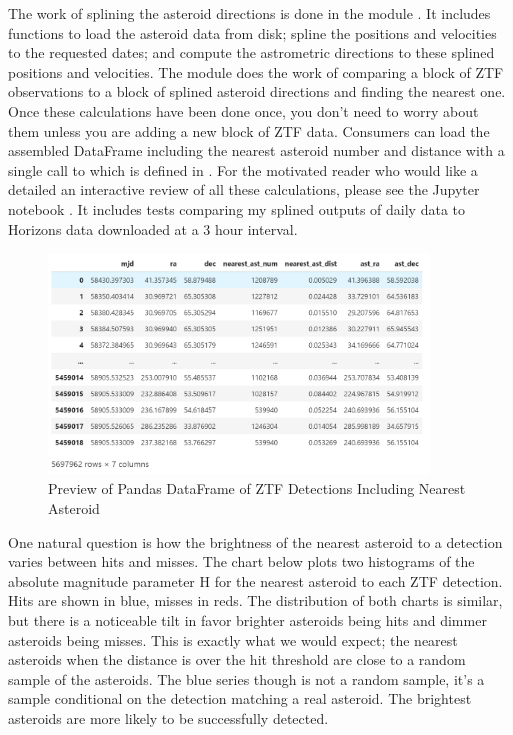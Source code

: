 The work of splining the asteroid directions is done in the module .
It includes functions to load the asteroid data from disk; spline the positions and velocities to the requested dates;
and compute the astrometric directions to these splined positions and velocities.
The module  does the work of comparing a block of ZTF observations to a block of splined asteroid directions and finding the nearest one.
Once these calculations have been done once, you don't need to worry about them unless you are adding a new block of ZTF data.
Consumers can load the assembled DataFrame including the nearest asteroid number and distance with 
a single call to  which is defined in .
For the motivated reader who would like a detailed an interactive review of all these calculations, please see the Jupyter notebook .
It includes tests comparing my splined outputs of daily data to Horizons data downloaded at a 3 hour interval.

\begin{figure}[hbt!]
\begin{center}
\includegraphics[width=0.9\textwidth]{../figs/ztf/ztf_nearest_ast_dataframe.png}
\caption{Preview of Pandas DataFrame of ZTF Detections Including Nearest Asteroid}
\end{center}
\end{figure}

One natural question is how the brightness of the nearest asteroid to a detection varies between hits and misses.
The chart below plots two histograms of the absolute magnitude parameter H for the nearest asteroid to each ZTF detection.
Hits are shown in blue, misses in reds.
The distribution of both charts is similar, but there is a noticeable tilt 
in favor brighter asteroids being hits and dimmer asteroids being misses.
This is exactly what we would expect; 
the nearest asteroids when the distance is over the hit threshold are close to a random sample of the asteroids.
The blue series though is not a random sample, it's a sample conditional on the detection matching a real asteroid.
The brightest asteroids are more likely to be successfully detected.


